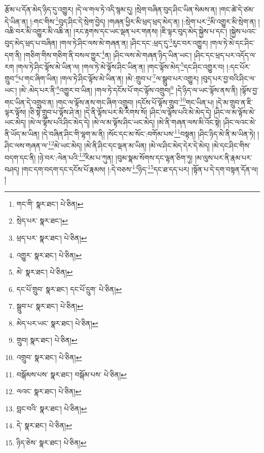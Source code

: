 རྩོམ་པ་དོན་མེད་ཉིད་དུ་འགྱུར། །དེ་ལ་གལ་ཏེ་འདི་སྙམ་དུ། །སྲེག་བཞིན་བུད་ཤིང་ཡིན་སེམས་ན། །གང་ཚེ་དེ་ཙམ་དེ་ཡིན་ན། །:གང་གིས་\footnote{གང་གི་  སྣར་ཐང་།  པེ་ཅིན། }བུད་ཤིང་དེ་སྲེག་བྱེད། །གཞན་ཕྱིར་མི་ཕྲད་ཕྲད་མེད་ན། །:སྲེག་པར་\footnote{སྲེད་པར་  སྣར་ཐང་། }མི་འགྱུར་མི་སྲེག་ན། །འཆི་བར་མི་འགྱུར་མི་འཆི་ན། །རང་རྟགས་དང་ཡང་ལྡན་པར་གནས། །ཇི་ལྟར་བུད་མེད་སྐྱེས་པ་དང་། །སྐྱེས་པའང་བུད་མེད་ཕྲད་པ་བཞིན། །གལ་ཏེ་ཤིང་ལས་མེ་གཞན་ན། །ཤིང་དང་:ཕྲད་དུ་\footnote{ཕྲད་པར་  སྣར་ཐང་།  པེ་ཅིན། }རུང་བར་འགྱུར། །གལ་ཏེ་མེ་དང་ཤིང་དག་ནི། །གཅིག་གིས་གཅིག་ནི་བསལ་གྱུར་\footnote{འགྱུར་  སྣར་ཐང་།  པེ་ཅིན། }ན། །ཤིང་ལས་མེ་གཞན་ཉིད་ཡིན་ཡང་། །ཤིང་དང་ཕྲད་པར་འདོད་ལ་རག །གལ་ཏེ་ཤིང་ལྟོས་མེ་ཡིན་ལ། །གལ་ཏེ་མེ་ལྟོས་ཤིང་ཡིན་ན། །གང་ལྟོས་མེད་\footnote{མེ་  སྣར་ཐང་།  པེ་ཅིན། }དང་ཤིང་འགྱུར་བ། །:དང་པོར་གྲུབ་\footnote{དང་པོ་གྲུབ་  སྣར་ཐང་། དང་པོ་དྲུག་  པེ་ཅིན། }པ་གང་ཞིག་ཡིན། །གལ་ཏེ་ཤིང་ལྟོས་མེ་ཡིན་ན། །མེ་:གྲུབ་པ་\footnote{སྒྲུབ་པ་  སྣར་ཐང་།  པེ་ཅིན། }ལ་སྒྲུབ་པར་འགྱུར། །བུད་པར་བྱ་བའི་ཤིང་ལ་ཡང་། །མེ་:མེད་པར་ནི་\footnote{མེད་པར་ཡང་  སྣར་ཐང་།  པེ་ཅིན། }འགྱུར་བ་ཡིན། །གལ་ཏེ་དངོས་པོ་གང་ལྟོས་འགྲུབ།\footnote{གྲུབ།  སྣར་ཐང་།  པེ་ཅིན། } །དེ་ཉིད་ལ་ཡང་ལྟོས་ནས་ནི། །ལྟོས་བྱ་གང་ཡིན་དེ་འགྲུབ་ན། །གང་ལ་ལྟོས་ནས་གང་ཞིག་འགྲུབ། །དངོས་པོ་ལྟོས་གྲུབ་\footnote{འགྲུབ་  སྣར་ཐང་།  པེ་ཅིན། }གང་ཡིན་པ། །དེ་མ་གྲུབ་ན་ཇི་ལྟར་ལྟོས། །ཅི་སྟེ་གྲུབ་པ་ལྟོས་ཤེ་ན། །དེ་ནི་ལྟོས་པར་མི་རིགས་སོ། །ཤིང་ལ་ལྟོས་པའི་མེ་མེད་དེ། །ཤིང་ལ་མ་ལྟོས་མེ་ཡང་མེད། །མེ་ལ་ལྟོས་པའི་ཤིང་མེད་དེ། །མེ་ལ་མ་ལྟོས་ཤིང་ཡང་མེད། །མེ་ནི་གཞན་ལས་མི་འོང་སྟེ། །ཤིང་ལའང་མེ་ནི་ཡོད་མ་ཡིན། །དེ་བཞིན་ཤིང་གི་ལྷག་མ་ནི། །སོང་དང་མ་སོང་:བགོམ་པས་\footnote{བསྒོམས་པས་  སྣར་ཐང་། བསྒོམ་པས་  པེ་ཅིན། }བསྟན། །ཤིང་ཉིད་མེ་ནི་མ་ཡིན་ཏེ། །ཤིང་ལས་གཞན་ལ་\footnote{ལའང་  སྣར་ཐང་།  པེ་ཅིན། }མེ་ཡང་མེད། །མེ་ནི་ཤིང་དང་ལྡན་མ་ཡིན། །མེ་ལ་ཤིང་མེད་དེར་དེ་མེད། །མེ་དང་ཤིང་གིས་བདག་དང་ནི། །ཉེ་བར་:ལེན་པའི་\footnote{བླང་བའི་  སྣར་ཐང་།  པེ་ཅིན། }རིམ་པ་ཀུན། །བུམ་སྣམ་སོགས་དང་ལྷན་ཅིག་ཏུ། །མ་ལུས་པར་ནི་རྣམ་པར་བཤད། །གང་དག་བདག་དང་དངོས་པོ་རྣམས། །:དེ་བཅས་\footnote{དེ་  སྣར་ཐང་།  པེ་ཅིན། }ཉིད་\footnote{ཉིད་ཅེས་  སྣར་ཐང་།  པེ་ཅིན། }དང་ཐ་དད་པར། །སྟོན་པ་དེ་དག་བསྟན་དོན་ལ། །
